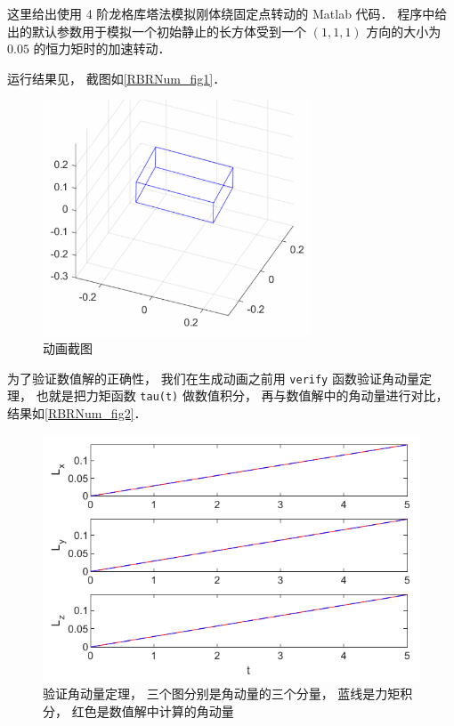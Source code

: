 

这里给出使用 4 阶龙格库塔法模拟刚体绕固定点转动的 Matlab 代码． 程序中给出的默认参数用于模拟一个初始静止的长方体受到一个 $(1,1,1)$ 方向的大小为 $0.05$ 的恒力矩时的加速转动．

运行结果见， 截图如\autoref{RBRNum_fig1}．

\begin{figure}[ht]
\centering
\includegraphics[width=8cm]{./figures/RBRNum1.png}
\caption{动画截图} \label{RBRNum_fig1}
\end{figure}

为了验证数值解的正确性， 我们在生成动画之前用 \lstinline|verify| 函数验证角动量定理， 也就是把力矩函数 \lstinline|tau(t)| 做数值积分， 再与数值解中的角动量进行对比， 结果如\autoref{RBRNum_fig2}．
\begin{figure}[ht]
\centering
\includegraphics[width=12cm]{./figures/RBRNum1.pdf}
\caption{验证角动量定理， 三个图分别是角动量的三个分量， 蓝线是力矩积分， 红色是数值解中计算的角动量} \label{RBRNum_fig2}
\end{figure}

